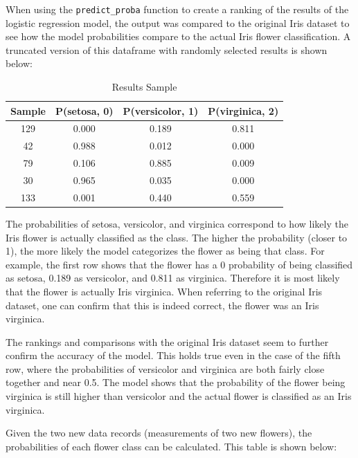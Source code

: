 \documentclass[journal]{IEEEtran}
\begin{document}
When using the \lstinline{predict_proba} function to create a ranking of the results of the logistic regression model, the output was compared to the original Iris dataset to see how the model probabilities compare to the actual Iris flower classification. A truncated version of this dataframe with randomly selected results is shown below:

\begin{table}[h!]
\centering
\begin{tabular}{ c | c c c }
Sample & P(setosa, 0) &	P(versicolor, 1) & P(virginica, 2) \\ 
\hline
129	& 0.000	& 0.189	& 0.811 \\
42	& 0.988	& 0.012	& 0.000 \\
79	& 0.106	& 0.885	& 0.009 \\
30	& 0.965	& 0.035	& 0.000 \\
133	& 0.001	& 0.440	& 0.559
\end{tabular}
\caption{Results Sample}
\label{table:model-comparison-table}
\end{table}

The probabilities of setosa, versicolor, and virginica correspond to how likely the Iris flower is actually classified as the class. The higher the probability (closer to 1), the more likely the model categorizes the flower as being that class. For example, the first row shows that the flower has a 0 probability of being classified as setosa, 0.189 as versicolor, and 0.811 as virginica. Therefore it is most likely that the flower is actually Iris virginica. When referring to the original Iris dataset, one can confirm that this is indeed correct, the flower was an Iris virginica. 

The rankings and comparisons with the original Iris dataset seem to further confirm the accuracy of the model. This holds true even in the case of the fifth row, where the probabilities of versicolor and virginica are both fairly close together and near 0.5. The model shows that the probability of the flower being virginica is still higher than versicolor and the actual flower is classified as an Iris virginica. 

Given the two new data records (measurements of two new flowers), the probabilities of each flower class can be calculated. This table is shown below: 
    
\end{document}
